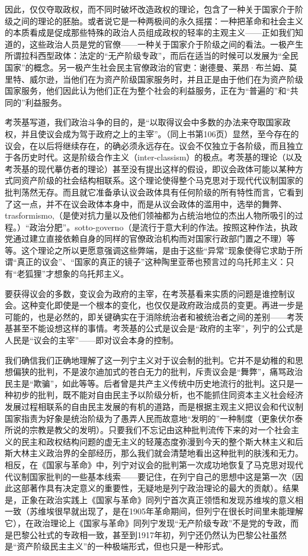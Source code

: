 \documentclass[UTF8, 12pt, a4paper]{ctexrep}
\begin{document}
因此，仅仅夺取政权，而不同时破坏改造政权的理论，包含了一种关于国家介于阶级之间的理论的胚胎。或者说它是一种两极间的永久摇摆：一种把革命和社会主义的本质看成是促成那些特殊的政治人员组成政权的轻率的主观主义——正如我们知道的，这些政治人员是党的官僚——一种关于国家介于阶级之间的看法。一极产生所谓拉科西型政体：法定的“无产阶级专政”，而后在适当的时候可以发展为“全民国家”的概念。另一极产生社会民主官僚政治的官吏：谢德曼、莱昂·布兰姆、莫里特、威尔逊，当他们在为资产阶级国家服务时，并且正是由于他们在为资产阶级国家服务，他们因此认为他们正在为整个社会的利益服务，正在为“普遍的”和“共同的”利益服务。

考茨基写道，我们政治斗争的目的，是“以取得议会中多数的办法来夺取国家政权，并且使议会成为驾于政府之上的主宰”。（同上书第106页）显然，至今存在的议会，在以后将继续存在，的确必须永远存在。议会不仅独立于各阶级，而且独立于各历史时代。这是阶级合作主义（inter-classism）的极点。考茨基的理论（以及考茨基的现代摹仿者的理论）甚至没有提出这样的假设，即议会政体可能以某种方式同资产阶级的社会结构相联系。这个理论使得整个马克思对于现代代议制国家的批判荡然无存。而且就它准备承认议会政体具有任何阶级的所有特性而言，它看到了这一点，并不在议会政体本身中，而是从议会政体的滥用中，选举的舞弊、trasformismo,（是使对抗力量以及他们领袖都为占统治地位的杰出人物所吸引的过程。）“政治分肥”。sotto-governo（是流行于意大利的作法。按照这种作法，执政党通过建立直接依赖自身的同样的官僚政治机构而对国家行政部门置之不理）等等。这个理论之所以更愿意强调这些弊端，是由于这些“异常”现象使得它求助于所谓“真正的议会”、“国家的真正的镜子”这种陶里亚蒂也预言过的乌托邦主义：只有“老狐狸”才想象的乌托邦主义。

要获得议会的多数，变议会为政府的主宰，在考茨基看来实质的问题是谁控制议会。这种变化即使是一个根本的变化，也仅仅是政府政治成员的变更。再进一步是可能的，也是必然的，即关键确实在于消除统治者和被统治者之间的差别——考茨基甚至不能设想这样的事情。考茨基的公式是议会是“政府的主宰”，列宁的公式是人民是“议会的主宰”——即对议会本身的控制。

我们确信我们正确地理解了这一列宁主义对于议会制的批判。它并不是幼稚的和思想偏狭的批判，不是波尔迪加式的苍白无力的批判，斥责议会是“舞弊”，痛骂政治民主是“欺骗”，如此等等。后者曾是共产主义传统中历史地流行的批判。这只是一种初步的批判，既不能对自由民主予以阶级分析，也不能抓住同资本主义社会经济发展过程相联系的自由民主发展的有机的道路，而是根据主观主义把议会和代议制国家指责为好象是统治阶级为了愚弄人民而故意地“发明的”一种制度（更象伏尔泰所说的宗教是教父的发明）。只要我们不忘记由这种批判流传下来的对一个社会主义的民主和政权结构问题的虚无主义的轻蔑态度弥漫到今天的整个斯大林主义和后斯大林主义政治界的全部经历，那么我们就会清楚地看出这种批判的肤浅和无力。相反，在《国家与革命》中，列宁对议会的批判第一次成功地恢复了马克思对现代代议制国家批判的一些基本线索——要记住，在列宁自己的思想中这是第一次（因此这部著作具有决定意义的重要性，无疑地是列宁政治理论的最大的贡献）。结果是，正象在政治实践上《国家与革命》同列宁首次真正领悟和发现苏维埃的意义相一致（苏维埃很早就出现了，是在1905年革命期间，但列宁在很长时间里未能理解它），在政治理论上《国家与革命》同列宁发现“无产阶级专政”不是党的专政，而是巴黎公社式的专政相一致，甚至到1917年初，列宁还仍然认为巴黎公社虽然是“资产阶级民主主义”的一种极端形式，但也只是一种形式。
\end{document}
